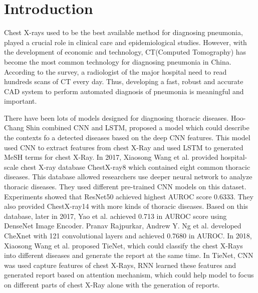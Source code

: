 \documentclass[runningheads]{llncs}
\begin{document}
\section{Introduction}
Chest X-rays used to be the best available method for diagnosing pneumonia, played a crucial role in clinical care\cite{Franquet2001Imaging} and epidemiological studies\cite{Thomas2005Standardized}. However, with the development of economic and technology, CT(Computed Tomography) has become the most common technology for diagnosing pneumonia in China. According to the survey, a radiologist of the major hospital need to read hundreds scans of CT every day. Thus, developing a fast, robust and accurate CAD system to perform automated diagnosis of pneumonia is meaningful and important. 

There have been lots of models designed for diagnosing thoracic diseases.
Hoo-Chang Shin \cite{Shin2016Learning} combined CNN and LSTM\cite{hochreiter1997long}, proposed a model which could describe the contexts fo a detected diseases based on the deep CNN features. This model used CNN to extract features from chest X-Ray and used LSTM to generated MeSH\cite{timmurphy.org} terms for chest X-Ray. In 2017, Xiaosong Wang et al.\cite{Wang2017ChestX} provided hospital-scale chest X-ray database ChestX-ray8 which contained eight common thoracic diseases. This database allowed researchers use deeper neural network to analyze thoracic diseases. They used different pre-trained CNN models on this dataset. Experiments showed that ResNet50 achieved highest AUROC score 0.6333. They also provided ChestX-ray14 with more kinds of thoracic diseases.
Based on this database, later in 2017, Yao et al.\cite{yao2017learning} achieved 0.713 in AUROC score using DenseNet Image Encoder. Pranav Rajpurkar, Andrew Y. Ng et al. \cite{Rajpurkar2017CheXNet} developed CheXnet with 121 convolutional layers and achieved 0.7680 in AUROC.
In 2018, Xiaosong Wang et al.\cite{Wang2018TieNet} proposed TieNet, which could classify the chest X-Rays into different diseases and generate the report at the same time. In TieNet, CNN was used capture features of chest X-Rays, RNN learned these features and generated report based on attention mechanism, which could help model to focus on different parts of chest X-Ray alone with the generation of reports. 
\end{document}
